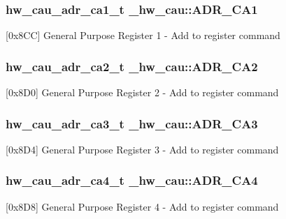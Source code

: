 \subsubsection[{\texorpdfstring{A\+D\+R\+\_\+\+C\+A1}{ADR_CA1}}]{ {\bf hw\+\_\+cau\+\_\+adr\+\_\+ca1\+\_\+t} \+\_\+hw\+\_\+cau\+::\+A\+D\+R\+\_\+\+C\+A1}\hypertarget{struct__hw__cau_a67d1e0d65da508592bdaec67f0e0f65a}{}\label{struct__hw__cau_a67d1e0d65da508592bdaec67f0e0f65a}
\mbox{[}0x8\+CC\mbox{]} General Purpose Register 1 -\/ Add to register command 
\subsubsection[{\texorpdfstring{A\+D\+R\+\_\+\+C\+A2}{ADR_CA2}}]{ {\bf hw\+\_\+cau\+\_\+adr\+\_\+ca2\+\_\+t} \+\_\+hw\+\_\+cau\+::\+A\+D\+R\+\_\+\+C\+A2}\hypertarget{struct__hw__cau_a351be85dd534a6d5191fbe7dc502a1de}{}\label{struct__hw__cau_a351be85dd534a6d5191fbe7dc502a1de}
\mbox{[}0x8\+D0\mbox{]} General Purpose Register 2 -\/ Add to register command 
\subsubsection[{\texorpdfstring{A\+D\+R\+\_\+\+C\+A3}{ADR_CA3}}]{ {\bf hw\+\_\+cau\+\_\+adr\+\_\+ca3\+\_\+t} \+\_\+hw\+\_\+cau\+::\+A\+D\+R\+\_\+\+C\+A3}\hypertarget{struct__hw__cau_ab83307d33c9d1f89d0ed096e4a10efa1}{}\label{struct__hw__cau_ab83307d33c9d1f89d0ed096e4a10efa1}
\mbox{[}0x8\+D4\mbox{]} General Purpose Register 3 -\/ Add to register command 
\subsubsection[{\texorpdfstring{A\+D\+R\+\_\+\+C\+A4}{ADR_CA4}}]{ {\bf hw\+\_\+cau\+\_\+adr\+\_\+ca4\+\_\+t} \+\_\+hw\+\_\+cau\+::\+A\+D\+R\+\_\+\+C\+A4}\hypertarget{struct__hw__cau_a31ba60dda9801f68fd2ab8e32eda12df}{}\label{struct__hw__cau_a31ba60dda9801f68fd2ab8e32eda12df}
\mbox{[}0x8\+D8\mbox{]} General Purpose Register 4 -\/ Add to register command 
